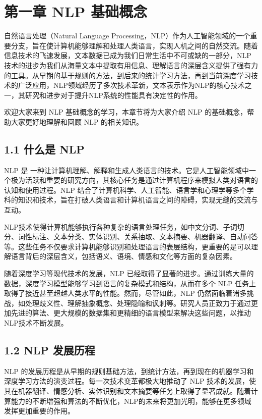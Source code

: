 \documentclass[
]{article}
\author{}
\date{}
\begin{document}
{
\setcounter{tocdepth}{3}
\tableofcontents
}
\section{第一章 NLP
基础概念}\label{ux7b2cux4e00ux7ae0-nlp-ux57faux7840ux6982ux5ff5}

自然语言处理（Natural Language
Processing，NLP）作为人工智能领域的一个重要分支，旨在使计算机能够理解和处理人类语言，实现人机之间的自然交流。随着信息技术的飞速发展，文本数据已成为我们日常生活中不可或缺的一部分，NLP技术的进步为我们从海量文本中提取有用信息、理解语言的深层含义提供了强有力的工具。从早期的基于规则的方法，到后来的统计学习方法，再到当前深度学习技术的广泛应用，NLP领域经历了多次技术革新，文本表示作为NLP的核心技术之一，其研究和进步对于提升NLP系统的性能具有决定性的作用。

欢迎大家来到 NLP 基础概念的学习，本章节将为大家介绍 NLP
的基础概念，帮助大家更好地理解和回顾 NLP 的相关知识。

\subsection{1.1 什么是 NLP}\label{ux4ec0ux4e48ux662f-nlp}

NLP 是
一种让计算机理解、解释和生成人类语言的技术。它是人工智能领域中一个极为活跃和重要的研究方向，其核心任务是通过计算机程序来模拟人类对语言的认知和使用过程。NLP
结合了计算机科学、人工智能、语言学和心理学等多个学科的知识和技术，旨在打破人类语言和计算机语言之间的障碍，实现无缝的交流与互动。

NLP技术使得计算机能够执行各种复杂的语言处理任务，如中文分词、子词切分、词性标注、文本分类、实体识别、关系抽取、文本摘要、机器翻译、自动问答等。这些任务不仅要求计算机能够识别和处理语言的表层结构，更重要的是可以理解语言背后的深层含义，包括语义、语境、情感和文化等方面的复杂因素。

随着深度学习等现代技术的发展，NLP
已经取得了显著的进步。通过训练大量的数据，深度学习模型能够学习到语言的复杂模式和结构，从而在多个
NLP 任务上取得了接近甚至超越人类水平的性能。然而，尽管如此，NLP
仍然面临着诸多挑战，如处理歧义性、理解抽象概念、处理隐喻和讽刺等。研究人员正致力于通过更加先进的算法、更大规模的数据集和更精细的语言模型来解决这些问题，以推动NLP技术不断发展。

\subsection{1.2 NLP 发展历程}\label{nlp-ux53d1ux5c55ux5386ux7a0b}

NLP
的发展历程是从早期的规则基础方法，到统计方法，再到现在的机器学习和深度学习方法的演变过程。每一次技术变革都极大地推动了
NLP
技术的发展，使其在机器翻译、情感分析、实体识别和文本摘要等任务上取得了显著成就。随着计算能力的不断增强和算法的不断优化，NLP的未来将更加光明，能够在更多领域发挥更加重要的作用。
\end{document}
